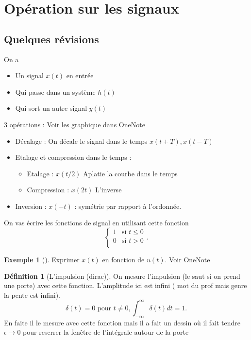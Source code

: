 \documentclass{article}
\theoremstyle{plain}%
\theoremstyle{definition}
\newtheorem{defn}{Définition}[section]
\newtheorem{exmp}{Exemple}[section]
\theoremstyle{remark}
\begin{document}
\section{Opération sur les signaux}
\subsection{Quelques révisions}
On a \begin{itemize}
    \item Un signal $ x(t) $ en entrée
    \item Qui passe dans un système $ h(t) $ 
    \item Qui sort un autre signal $ y(t) $ 
\end{itemize}
3 opérations : Voir les graphique dans OneNote
\begin{itemize}
    \item Décalage : On décale le signal dans le temps $ x(t+T), x(t-T)$ 
    \item Etalage et compression dans le temps : \begin{itemize}
        \item Etalage : $ x(t/2) $ Aplatie la courbe dans le temps 
        \item Compression : $ x(2t) $ L'inverse
    \end{itemize}
    \item Inversion : $ x(-t) $ : symétrie par rapport à l'ordonnée. 
\end{itemize}

On vas écrire les fonctions de signal en utilisant cette fonction
\[
    \begin{cases}
        1 &\text{si } t \leq 0\\
        0 &\text{si } t > 0\\
    \end{cases} 
.\]
\begin{exmp}[]
    Exprimer $ x(t) $ en fonction de $ u(t) $. Voir OneNote
\end{exmp}

\begin{defn}[L'impulsion (dirac)]
    On mesure l'impulsion (le saut si on prend une porte) avec cette fonction. L'amplitude ici est infini ( mot du prof mais genre la pente est infini). 
    \[
        \delta (t) = 0 \text{ pour } t \neq 0 , \int_{- \infty }^{\infty } \delta (t) dt = 1
    .\]
    En faite il le mesure avec cette fonction mais il a fait un dessin où il fait tendre $ \epsilon \to 0 $ pour reserrer la fenêtre de l'intégrale autour de la porte 
\end{defn}
\end{document}
